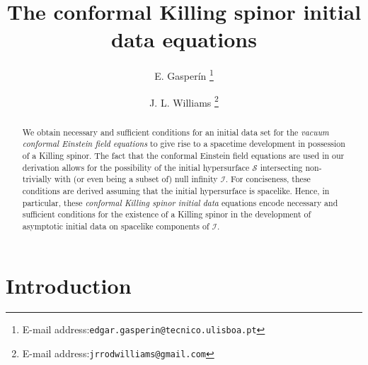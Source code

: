 \documentclass[10pt,a4paper]{article}
\theoremstyle{plain}
\begin{document}
\title{\textbf{The conformal Killing spinor initial data equations}}


\author[1]{E. Gasper\'in \footnote{E-mail address:{\tt edgar.gasperin@tecnico.ulisboa.pt}}}
\author[2]{J. L. Williams \footnote{E-mail address:{\tt jrrodwilliams@gmail.com}}}



\maketitle
\begin{abstract}
  We obtain necessary and sufficient conditions for an initial data
  set for the \emph{vacuum conformal Einstein field equations} to give
  rise to a spacetime development in possession of a Killing spinor.  The
  fact that the conformal Einstein field equations are used in our
  derivation allows for the possibility of the initial hypersurface
  $\mathcal{S}$ intersecting non-trivially with (or even being a subset of)
  null infinity $\mathscr{I}$.  For conciseness, these
  conditions are derived assuming that the initial hypersurface is
  spacelike. Hence, in particular, these \emph{conformal Killing spinor initial data} equations encode necessary and
  sufficient conditions for the existence of a Killing spinor in the
  development of asymptotic initial data on spacelike components of
  $\mathscr{I}$.
\end{abstract}


\section{Introduction}
\label{sec:Introduction}
\end{document}
